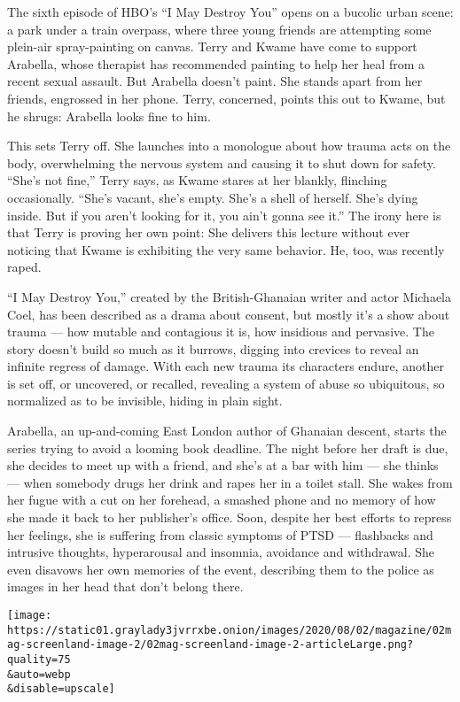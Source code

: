 The sixth episode of HBO's ``I May Destroy You'' opens on a bucolic
urban scene: a park under a train overpass, where three young friends
are attempting some plein-air spray-painting on canvas. Terry and Kwame
have come to support Arabella, whose therapist has recommended painting
to help her heal from a recent sexual assault. But Arabella doesn't
paint. She stands apart from her friends, engrossed in her phone. Terry,
concerned, points this out to Kwame, but he shrugs: Arabella looks fine
to him.

This sets Terry off. She launches into a monologue about how trauma acts
on the body, overwhelming the nervous system and causing it to shut down
for safety. ``She's not fine,'' Terry says, as Kwame stares at her
blankly, flinching occasionally. ``She's vacant, she's empty. She's a
shell of herself. She's dying inside. But if you aren't looking for it,
you ain't gonna see it.'' The irony here is that Terry is proving her
own point: She delivers this lecture without ever noticing that Kwame is
exhibiting the very same behavior. He, too, was recently raped.

``I May Destroy You,'' created by the British-Ghanaian writer and actor
Michaela Coel, has been described as a drama about consent, but mostly
it's a show about trauma --- how mutable and contagious it is, how
insidious and pervasive. The story doesn't build so much as it burrows,
digging into crevices to reveal an infinite regress of damage. With each
new trauma its characters endure, another is set off, or uncovered, or
recalled, revealing a system of abuse so ubiquitous, so normalized as to
be invisible, hiding in plain sight.

Arabella, an up-and-coming East London author of Ghanaian descent,
starts the series trying to avoid a looming book deadline. The night
before her draft is due, she decides to meet up with a friend, and she's
at a bar with him --- she thinks --- when somebody drugs her drink and
rapes her in a toilet stall. She wakes from her fugue with a cut on her
forehead, a smashed phone and no memory of how she made it back to her
publisher's office. Soon, despite her best efforts to repress her
feelings, she is suffering from classic symptoms of PTSD --- flashbacks
and intrusive thoughts, hyperarousal and insomnia, avoidance and
withdrawal. She even disavows her own memories of the event, describing
them to the police as images in her head that don't belong there.

\texttt{[image: https://static01.graylady3jvrrxbe.onion/images/2020/08/02/magazine/02mag-screenland-image-2/02mag-screenland-image-2-articleLarge.png?quality=75\\\&auto=webp\\\&disable=upscale]}

